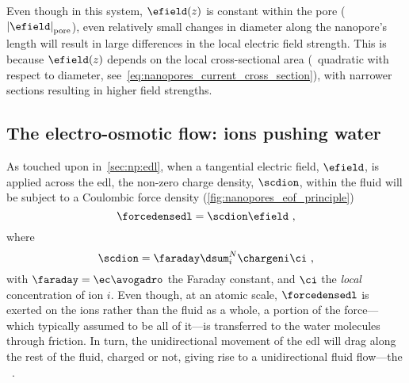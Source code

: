%
Even though in this system, $\efield (z)$ is constant within the pore ($\left| \efield
\right|_{\text{pore}}$), even relatively small changes in diameter along the nanopore's length will result in
large differences in the local electric field strength. This is because $\efield (z)$ depends on the local
cross-sectional area (\ie~quadratic with respect to diameter, see~\cref{eq:nanopores_current_cross_section}),
with narrower sections resulting in higher field strengths.


\subsection{The electro-osmotic flow: ions pushing water}
%
\label{sec:np:eof}
%

As touched upon in~\cref{sec:np:edl}, when a tangential electric field, $\efield$, is applied across the
\gls{edl}, the non-zero charge density, $\scdion$, within the fluid will be subject to a Coulombic force
density (\cref{fig:nanopores_eof_principle})
%
\begin{equation}\label{eq:nanopores_edl_force}
  \forcedensedl = \scdion \efield
  \text{ ,}
\end{equation}
%
where
%
\begin{equation}\label{eq:nanopores_ion_scd}
  \scdion = \faraday \dsum_i^N \chargeni \ci
  \text{ ,}
\end{equation}
%
with $\faraday = \ec \avogadro$ the Faraday constant, and $\ci$ the \emph{local} concentration of ion $i$.
Even though, at an atomic scale, $\forcedensedl$ is exerted on the ions rather than the fluid as a whole, a
portion of the force---which typically assumed to be all of it---is transferred to the water molecules through
friction. In turn, the unidirectional movement of the \gls{edl} will drag along the rest of the fluid, charged
or not, giving rise to a unidirectional fluid flow---the ~\cite{Bocquet-2010}.


